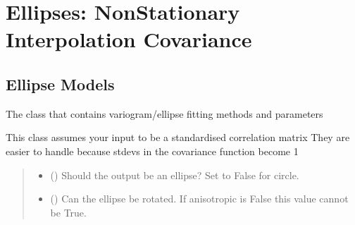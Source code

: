\documentclass[letterpaper,10pt,english]{sphinxmanual}
\begin{document}
\sphinxstepscope


\chapter{Ellipses: Non\sphinxhyphen{}Stationary Interpolation Covariance}
\label{\detokenize{ellipse:ellipses-non-stationary-interpolation-covariance}}\label{\detokenize{ellipse::doc}}

\section{Ellipse Models}
\label{\detokenize{ellipse:ellipse-models}}

\begin{fulllineitems}
\label{\detokenize{ellipse:glomar_gridding.ellipse.EllipseModel}}
\pysigstartsignatures
\pysiglinewithargsret
{}
{\sphinxparamcomma {}\sphinxparamcomma {}\sphinxparamcomma {}\sphinxparamcomma {}}
{}
\pysigstopsignatures
\sphinxAtStartPar
The class that contains variogram/ellipse fitting methods and parameters

\sphinxAtStartPar
This class assumes your input to be a standardised correlation matrix
They are easier to handle because stdevs in the covariance function become 1
\begin{quote}\begin{description}
\begin{itemize}
\item {}
\sphinxAtStartPar
{} () \textendash{} Should the output be an ellipse? Set to False for circle.

\item {}
\sphinxAtStartPar
{} () \textendash{} Can the ellipse be rotated. If anisotropic is False this value cannot
be True.


\end{itemize}
\end{description}
\end{quote}
\end{fulllineitems}
\end{document}
